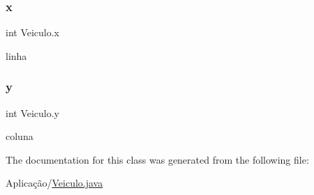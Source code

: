 \subsubsection{\texorpdfstring{x}{x}}
{\footnotesize\ttfamily int Veiculo.\+x\hspace{0.3cm}{\ttfamily [protected]}}



linha 

\mbox{\label{class_veiculo_af25046404db7c2786c0d9e468bb1fb64}} 
\subsubsection{\texorpdfstring{y}{y}}
{\footnotesize\ttfamily int Veiculo.\+y\hspace{0.3cm}{\ttfamily [protected]}}



coluna 



The documentation for this class was generated from the following file\+:\begin{DoxyCompactItemize}
\item 
Aplicação/\mbox{\hyperlink{_veiculo_8java}{Veiculo.\+java}}\end{DoxyCompactItemize}
